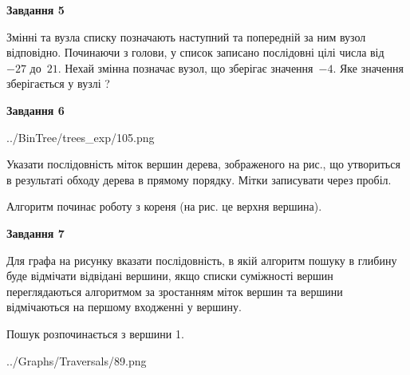 \documentclass[12pt, ukrainian]{article}
\begin{document}
{\begin {large}
{\begin {center}\textbf{Завдання 5}\end {center}}\par
Змінні  та  вузла списку позначають наступний та попередній за ним вузол відповідно. Починаючи з голови, у список записано послідовні цілі числа від~$-27$ до~$21$. Нехай змінна  позначає вузол, що зберігає значення~$-4$.
Яке значення зберігається у вузлі  ?\par
\newpage

{\begin {center}\textbf{Завдання 6}\end {center}}\par

\begin{center}
	{../BinTree/trees_exp/105.png}
\end{center}
Указати послідовність міток вершин дерева, зображеного на рис., що утвориться в результаті обходу дерева в прямому порядку. Мітки записувати через пробіл.\par Алгоритм починає роботу з кореня (на рис. це верхня вершина).\par
\newpage

{\begin {center}\textbf{Завдання 7}\end {center}}\par
Для графа на рисунку вказати послідовність, в якій алгоритм пошуку в глибину буде відмічати відвідані вершини, якщо списки суміжності вершин переглядаються алгоритмом за зростанням міток вершин та вершини відмічаються на першому вход\-женні у вершину.\par
Пошук розпочинається з вершини 1.\par

\begin{center}
	{../Graphs/Traversals/89.png}
\end{center}\par
\newpage


\end{large}}
\end{document}

